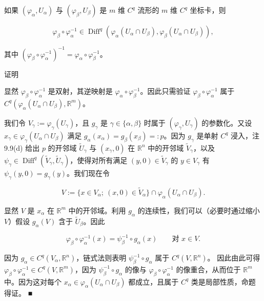 \begin{proposition}

如果 $ (\varphi_{\alpha}, U_{\alpha}) $ 与 $ (\varphi_{\beta}, U_{\beta}) $ 是 $ m $ 维 $ C^{q} $ 流形的 $ m $ 维 $ C^{q} $ 坐标卡，则

\[
\varphi_{\beta} \circ \varphi_{\alpha}^{-1} \in \operatorname{Diff}^{q}\left(\varphi_{\alpha}(U_{\alpha} \cap U_{\beta}), \varphi_{\beta}(U_{\alpha} \cap U_{\beta})\right) ,
\]

其中 $ (\varphi_{\beta} \circ \varphi_{\alpha}^{-1})^{-1} = \varphi_{\alpha} \circ \varphi_{\beta}^{-1} $。

证明

\begin{subitems}
\item

显然 $ \varphi_{\beta} \circ \varphi_{\alpha}^{-1} $ 是双射，其逆映射是 $ \varphi_{\alpha} \circ \varphi_{\beta}^{-1} $。因此只需验证 $ \varphi_{\beta} \circ \varphi_{\alpha}^{-1} $ 属于 $ C^{q}(\varphi_{\alpha}(U_{\alpha} \cap U_{\beta}), \mathbb{R}^{m}) $。

\item

我们令 $ V_{\gamma} := \varphi_{\gamma}(U_{\gamma}) $，且 $ g_{\gamma} $ 是 $ \gamma \in \{\alpha, \beta\} $ 时属于 $ (\varphi_{\gamma}, U_{\gamma}) $ 的参数化。又设 $ x_{\gamma} \in \varphi_{\gamma}(U_{\alpha} \cap U_{\beta}) $ 满足 $ g_{\alpha}(x_{\alpha}) = g_{\beta}(x_{\beta}) =: p $。因为 $ g_{\gamma} $ 是单射 $ C^{q} $ 浸入，注 9.9(d) 给出 $ p $ 的开邻域
$ \tilde{U}_{\gamma} $ 与 $ (x_{\gamma}, 0) $ 在 $ \mathbb{R}^{n} $ 中的开邻域 $ \tilde{V}_{\gamma} $，以及 $ \psi_{\gamma} \in \operatorname{Diff}^{q}(\tilde{V}_{\gamma}, \tilde{U}_{\gamma}) $，使得对所有满足 $ (y, 0) \in \tilde{V}_{\gamma} $ 的 $ y \in V_{\gamma} $ 有 $ \psi_{\gamma}(y, 0) = g_{\gamma}(y) $。我们现在令

\[
V := \{x \in V_{\alpha} ; \ (x, 0) \in \tilde{V}_{\alpha}\} \cap \varphi_{\alpha}(U_{\alpha} \cap U_{\beta}) .
\]

显然 $ V $ 是 $ x_{\alpha} $ 在 $ \mathbb{R}^{m} $ 中的开邻域。利用 $ g_{\alpha} $ 的连续性，我们可以（必要时通过缩小 $ V $）假设 $ g_{\alpha}(V) $ 含于 $ \tilde{U}_{\beta} $。因此

\[
\varphi_{\beta} \circ \varphi_{\alpha}^{-1}(x) = \psi_{\beta}^{-1} \circ g_{\alpha}(x) \qquad \text{对 } x \in V .
\]

因为 $ g_{\alpha} \in C^{q}(V_{\alpha}, \mathbb{R}^{n}) $，链式法则表明 $ \psi_{\beta}^{-1} \circ g_{\alpha} $ 属于 $ C^{q}(V, \mathbb{R}^{n}) $。 因此由此可得 $ \varphi_{\beta} \circ \varphi_{\alpha}^{-1} \in C^{q}(V, \mathbb{R}^{m}) $，因为 $ \psi_{\beta}^{-1} \circ g_{\alpha} $ 的像与 $ \varphi_{\beta} \circ \varphi_{\alpha}^{-1} $ 的像重合，从而位于 $ \mathbb{R}^{m} $ 中。因为这对每个 $ x_{\alpha} \in \varphi_{\alpha}(U_{\alpha} \cap U_{\beta}) $ 都成立，且属于 $ C^{q} $ 类是局部性质，命题得证。 \nobreak\hspace{0.35em}■

\end{subitems}

\end{proposition}
